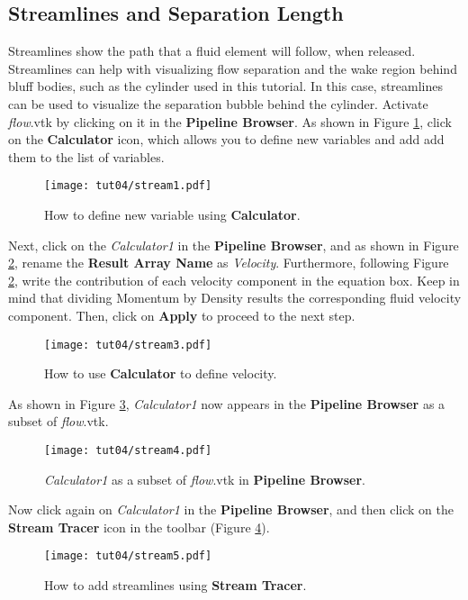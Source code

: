 \subsection{Streamlines and Separation Length}
Streamlines show the path that a fluid element will follow, when released. Streamlines can help with visualizing flow separation and the wake region behind bluff bodies, such as the cylinder used in this tutorial. In this case, streamlines can be used to visualize the separation bubble behind the cylinder. Activate \textit{flow}.vtk by clicking on it in the \textbf{Pipeline Browser}. As shown in Figure \ref{fig4:stream1_4}, click on the \textbf{Calculator} icon, which allows you to define new variables and add add them to the list of variables.
\begin{figure}[htbp]
    \centering
    \texttt{[image: tut04/stream1.pdf]}
    \caption{How to define new variable using \textbf{Calculator}.}
    \label{fig4:stream1_4}
\end{figure}
Next, click on the \textit{Calculator1} in the \textbf{Pipeline Browser}, and as shown in Figure \ref{fig4:stream3_4}, rename the \textbf{Result Array Name} as \textit{Velocity}. Furthermore, following Figure \ref{fig4:stream3_4}, write the contribution of each velocity component in the equation box. Keep in mind that dividing Momentum by Density results the corresponding fluid velocity component. Then, click on \textbf{Apply} to proceed to the next step.
\begin{figure}[htbp]
    \centering
    \texttt{[image: tut04/stream3.pdf]}
    \caption{How to use \textbf{Calculator} to define velocity.}
    \label{fig4:stream3_4}
\end{figure}
As shown in Figure \ref{fig4:stream4_4}, \textit{Calculator1} now appears in the \textbf{Pipeline Browser} as a subset of \textit{flow}.vtk.
\begin{figure}[htbp]
    \centering
    \texttt{[image: tut04/stream4.pdf]}
    \caption{\textit{Calculator1} as a subset of \textit{flow}.vtk in \textbf{Pipeline Browser}.}
    \label{fig4:stream4_4}
\end{figure}
Now click again on \textit{Calculator1} in the \textbf{Pipeline Browser}, and then click on the \textbf{Stream Tracer} icon in the toolbar (Figure \ref{fig4:stream5_4}).
\begin{figure}[htbp]
    \centering
    \texttt{[image: tut04/stream5.pdf]}
    \caption{How to add streamlines using \textbf{Stream Tracer}.}
    \label{fig4:stream5_4}
\end{figure}
